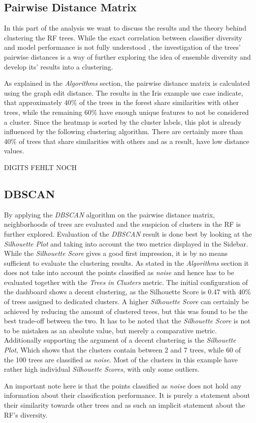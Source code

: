 \documentclass[a4paper, 12pt]{article}
\begin{document}
\subsection{Pairwise Distance Matrix}
In this part of the analysis we want to discuss the results and the theory behind clustering the RF trees.
While the exact correlation between classifier diversity and model performance is not fully understood
\cite{kuncheva2003measures}, the investigation of the trees' pairwise distances is a way of further exploring
the idea of ensemble diversity and develop its' results into a clustering. \par
As explained in the \textit{Algorithms} section, the pairwise distance matrix is calculated using the graph
edit distance. The results in the Iris example use case indicate, that approximately 40\% of the trees in the
forest share similarities with other trees, while the remaining 60\% have enough unique features to not be
considered a cluster. Since the heatmap is sorted by the cluster labels, this plot is already influenced by
the following clustering algorithm. There are certainly more than 40\% of trees that share similarities with
others and as a result, have low distance values.

DIGITS FEHLT NOCH

\subsection{DBSCAN}
By applying the \textit{DBSCAN} algorithm on the pairwise distance matrix, neighborhoods of trees are evaluated
and the suspicion of clusters in the RF is further explored. Evaluation of the \textit{DBSCAN} result is done
best by looking at the \textit{Silhouette Plot} and taking into account the two metrics displayed in the
Sidebar. While the \textit{Silhouette Score} gives a good first impression, it is by no means sufficient to
evaluate the clustering results. As stated in the \textit{Algorithms} section it does not take into account the
points classified as \textit{noise} and hence has to be evaluated together with the \textit{Trees in Clusters}
metric. The initial configuration of the dashboard shows a decent clustering, as the Silhouette Score is 0.47
with 40\% of trees assigned to dedicated clusters. A higher \textit{Silhouette Score} can certainly be achieved
by reducing the amount of clustered trees, but this was found to be the best trade-off between the two. It has
to be noted that the \textit{Silhouette Score} is not to be mistaken as an absolute value, but merely a
comparative metric. Additionally supporting the argument of a decent clustering is the \textit{Silhouette Plot},
Which shows that the clusters contain between 2 and 7 trees, while 60 of the 100 trees are classified as
\textit{noise}. Most of the clusters in this example have rather high individual \textit{Silhouette Scores},
with only some outliers. \par
An important note here is that the points classified as \textit{noise} does not hold any information about their
classification performance. It is purely a statement about their similarity towards other trees and as such an
implicit statement about the RF's diversity.
\end{document}
